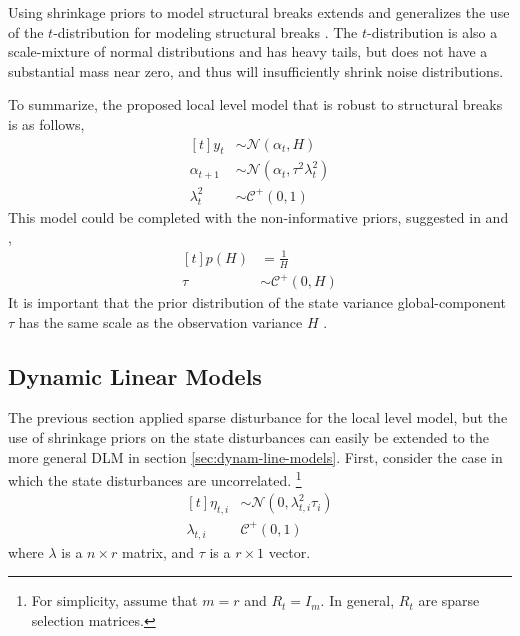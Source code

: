 \documentclass{article}
\newcommand{\dist}[1]{\mathcal{#1}}
\newcommand{\paren}[1]{\ensuremath{\left(#1\right)}}
\newcommand{\dnorm}[1]{\ensuremath{\dist{N}\paren{#1}}}
\newcommand{\dhalfcauchy}[1]{\ensuremath{\dist{C}^{+}\paren{#1}}}
\begin{document}
Using shrinkage priors to model structural breaks extends and generalizes the use of the $t$-distribution for modeling structural breaks \parencites{HarveyKoopman2000}[184][]{DurbinKoopman2001}{PetrisPetroneEtAl2009}.
The $t$-distribution is also a scale-mixture of normal distributions and has heavy tails, but does not have a substantial mass near zero, and thus will insufficiently shrink noise distributions.

To summarize, the proposed local level model that is robust to structural breaks is as follows,
\begin{equation}
  \label{eq:10}
  \begin{aligned}[t]
    y_{t} &\sim \dnorm{\alpha_{t}, H} \\
    \alpha_{t + 1} &\sim \dnorm{\alpha_{t}, \tau^{2} \lambda^{2}_{t}} \\
    \lambda^{2}_{t} & \sim \dhalfcauchy{0, 1}
  \end{aligned}
\end{equation}
This model could be completed with the non-informative priors, suggested in \textcite{CarvalhoPolsonScott2009} and \textcite{PolsonScott2010},
\begin{equation}
  \label{eq:7}
  \begin{aligned}[t]
    p(H) &= \frac{1}{H} \\
    \tau &\sim \dhalfcauchy{0, H}
  \end{aligned}
\end{equation}
It is important that the prior distribution of the state variance global-component $\tau$ has the same scale as the observation variance $H$ \parencite{PolsonScott2012}.

\subsection{Dynamic Linear Models}
\label{sec:multivariate}

The previous section applied sparse disturbance for the local level model, but the use of shrinkage priors on the state disturbances can easily be extended to the more general DLM in section \ref{sec:dynam-line-models}.
First, consider the case in which the state disturbances are uncorrelated.
\footnote{
  For simplicity, assume that $m = r$ and $R_{t} = I_{m}$.
  In general, $R_{t}$ are sparse selection matrices.
}
\begin{equation}
  \label{eq:20}
  \begin{aligned}[t]
    \eta_{t,i} &\sim \dnorm{0, \lambda_{t,i}^{2} \tau_{i}} \\
    \lambda_{t,i} & \dhalfcauchy{0, 1}
  \end{aligned}
\end{equation}
where $\lambda$ is a $n \times r$ matrix, and $\tau$ is a $r \times 1$ vector.
\end{document}
